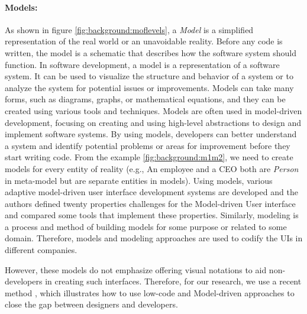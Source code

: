 \paragraph{Models:} 
As shown in figure \ref{fig:background:moflevels}, a \textit{Model} is a simplified representation of the real world or an unavoidable reality.
Before any code is written, the model is a schematic that describes how the software system should function.
In software development, a model is a representation of a software system. 
It can be used to visualize the structure and behavior of a system or to analyze the system for potential issues or improvements. 
Models can take many forms, such as diagrams, graphs, or mathematical equations, and they can be created using various tools and techniques. 
Models are often used in model-driven development, focusing on creating and using high-level abstractions to design and implement software systems. 
By using models, developers can better understand a system and identify potential problems or areas for improvement before they start writing code.
From the example \ref{fig:background:m1m2}, we need to create models for every entity of reality (e.g., An employee and a CEO both are \textit{Person} in meta-model but are separate entities in models).
Using models, various adaptive model-driven user interface development systems are developed \cite{article:mbse:akiki} and the authors defined twenty properties challenges for the Model-driven User interface and compared some tools that implement these properties.
Similarly, modeling is a process and method of building models for some purpose or related to some domain.
Therefore, models and modeling approaches are used to codify the UIs in different companies. 

However, these models do not emphasize offering visual notations to aid non-developers in creating such interfaces. 
Therefore, for our research, we use a recent method \cite{article:mbse:bexiga}, which illustrates how to use low-code and Model-driven approaches to close the gap between designers and developers.

\clearpage
